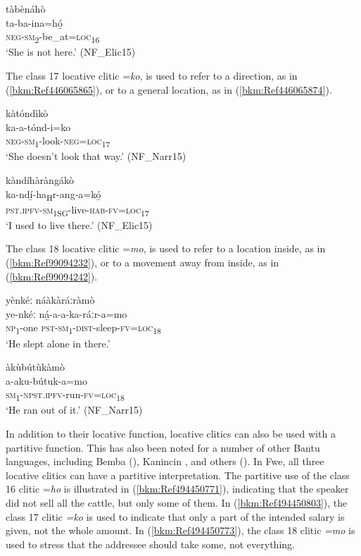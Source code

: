 \ea
\label{bkm:Ref446065854}
\glll tàbènáhò\\
ta-ba-ina=hó̲\\
\textsc{neg}-\textsc{sm}\textsubscript{2}-be\_at=\textsc{loc}\textsubscript{16}\\
\glt ‘She is not here.’ (NF\_Elic15)
\z

The class 17 locative clitic =\textit{ko}, is used to refer to a direction, as in (\ref{bkm:Ref446065865}), or to a general location, as in (\ref{bkm:Ref446065874}).

\ea
\label{bkm:Ref446065865}
\glll kàtóndìkò\\
ka-a-tónd-i=ko\\
\textsc{neg}-\textsc{sm}\textsubscript{1}-look-\textsc{neg}=\textsc{loc}\textsubscript{17}\\
\glt ‘She doesn’t look that way.’ (NF\_Narr15)
\z

\ea
\label{bkm:Ref446065874}
\glll kàndíhàràngákò\\
ka-ndí̲-ha\textsubscript{H}r-ang-a=kó̲\\
\textsc{pst}.\textsc{ipfv}-\textsc{sm}\textsubscript{1SG}-live-\textsc{hab}-\textsc{fv}=\textsc{loc}\textsubscript{17}\\
\glt ‘I used to live there.’ (NF\_Elic15)
\z

The class 18 locative clitic =\textit{mo}, is used to refer to a location inside, as in (\ref{bkm:Ref99094232}), or to a movement away from inside, as in (\ref{bkm:Ref99094242}).

\ea
\label{bkm:Ref99094232}
yènkéː náàkàráːràmò\\
\gll ye-nkéː  ná̲-a-a-ka-ráːr-a=mo\\
\textsc{np}\textsubscript{1}-one  \textsc{pst}-\textsc{sm}\textsubscript{1}-\textsc{dist}-sleep-\textsc{fv}=\textsc{loc}\textsubscript{18}\\
\glt ‘He slept alone in there.’
\z

\ea
\label{bkm:Ref99094242}
\glll àkùbútùkàmò\\
a-aku-bútuk-a=mo\\
\textsc{sm}\textsubscript{1}-\textsc{npst}.\textsc{ipfv}-run-\textsc{fv}=\textsc{loc}\textsubscript{18}\\
\glt ‘He ran out of it.’ (NF\_Narr15)
\z

In addition to their locative function, locative clitics can also be used with a partitive function. This has also been noted for a number of other Bantu languages, including Bemba (\citealt{MartenKula2014}), Kanincin \citep{DevosEtAl2010}, and others (\citealt{PersohnDevos2017}). In Fwe, all three locative clitics can have a partitive interpretation. The partitive use of the class 16 clitic =\textit{ho} is illustrated in (\ref{bkm:Ref494450771}), indicating that the speaker did not sell all the cattle, but only some of them. In (\ref{bkm:Ref494450803}), the class 17 clitic \textit{=ko} is used to indicate that only a part of the intended salary is given, not the whole amount. In (\ref{bkm:Ref494450773}), the class 18 clitic \textit{=mo} is used to stress that the addressee should take some, not everything.

